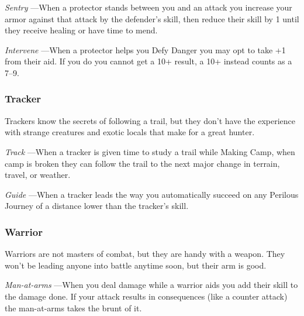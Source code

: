  

{\em Sentry} —When a protector stands between you and an attack you increase your armor against that attack by the defender's skill, then reduce their skill by 1 until they receive healing or have time to mend.

 

{\em Intervene} —When a protector helps you Defy Danger you may opt to take +1 from their aid. If you do you cannot get a 10+ result, a 10+ instead counts as a 7–9.

 
\subsubsection{Tracker}   
 

Trackers know the secrets of following a trail, but they don't have the experience with strange creatures and exotic locals that make for a great hunter.

 

{\em Track} —When a tracker is given time to study a trail while Making Camp, when camp is broken they can follow the trail to the next major change in terrain, travel, or weather.

 

{\em Guide} —When a tracker leads the way you automatically succeed on any Perilous Journey of a distance lower than the tracker's skill.

 
\subsubsection{Warrior}   
 

Warriors are not masters of combat, but they are handy with a weapon. They won't be leading anyone into battle anytime soon, but their arm is good.

 

{\em Man-at-arms} —When you deal damage while a warrior aids you add their skill to the damage done. If your attack results in consequences (like a counter attack) the man-at-arms takes the brunt of it.

 





 
